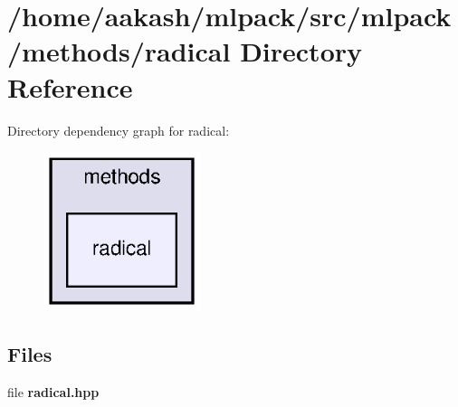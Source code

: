 \section{/home/aakash/mlpack/src/mlpack/methods/radical Directory Reference}
\label{dir_ea964724cc6f7233682f5d8978c9745d}
Directory dependency graph for radical\+:
\nopagebreak
\begin{figure}[H]
\begin{center}
\leavevmode
\includegraphics[width=130pt]{dir_ea964724cc6f7233682f5d8978c9745d_dep}
\end{center}
\end{figure}
\subsection*{Files}
\begin{DoxyCompactItemize}
\item 
file \textbf{ radical.\+hpp}
\end{DoxyCompactItemize}
